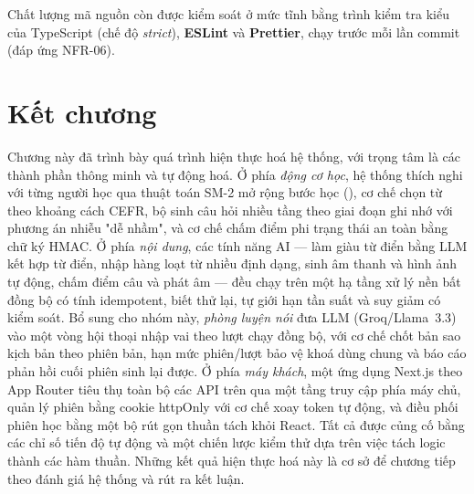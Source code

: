 Chất lượng mã nguồn còn được kiểm soát ở mức tĩnh bằng trình kiểm tra kiểu của
TypeScript (chế độ \textit{strict}), \textbf{ESLint} và \textbf{Prettier},
chạy trước mỗi lần commit (đáp ứng NFR-06).

\section{Kết chương}
\label{sec:ket-chuong-4}

Chương này đã trình bày quá trình hiện thực hoá hệ thống, với trọng tâm là các
thành phần thông minh và tự động hoá. Ở phía \textit{động cơ học}, hệ thống
thích nghi với từng người học qua thuật toán SM-2 mở rộng bước học
(), cơ chế chọn từ theo khoảng cách CEFR, bộ sinh câu hỏi nhiều
tầng theo giai đoạn ghi nhớ với phương án nhiễu "dễ nhầm", và cơ chế chấm điểm
phi trạng thái an toàn bằng chữ ký HMAC. Ở phía \textit{nội dung}, các tính
năng AI --- làm giàu từ điển bằng LLM kết hợp từ điển, nhập hàng loạt từ nhiều
định dạng, sinh âm thanh và hình ảnh tự động, chấm điểm câu và phát âm --- đều
chạy trên một hạ tầng xử lý nền bất đồng bộ có tính idempotent, biết thử lại,
tự giới hạn tần suất và suy giảm có kiểm soát. Bổ sung cho nhóm này, \textit{phòng
luyện nói} đưa LLM (Groq/Llama~3.3) vào một vòng hội thoại nhập vai theo lượt
chạy đồng bộ, với cơ chế chốt bản sao kịch bản theo phiên bản, hạn mức phiên/lượt
bảo vệ khoá dùng chung và báo cáo phản hồi cuối phiên sinh lại được. Ở phía
\textit{máy khách}, một
ứng dụng Next.js theo App Router tiêu thụ toàn bộ các API trên qua một tầng
truy cập phía máy chủ, quản lý phiên bằng cookie httpOnly với cơ chế xoay token
tự động, và điều phối phiên học bằng một bộ rút gọn thuần tách khỏi React. Tất
cả được củng cố bằng các chỉ số tiến độ tự động và một chiến lược kiểm thử dựa
trên việc tách logic thành các hàm thuần. Những kết quả hiện thực hoá này là cơ
sở để chương tiếp theo đánh giá hệ thống và rút ra kết luận.
